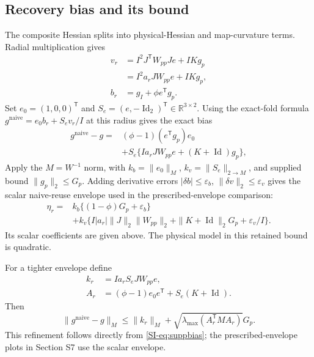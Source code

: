\subsection{Recovery bias and its bound}
The composite Hessian splits into physical-Hessian and map-curvature terms. Radial multiplication gives
\begin{equation}
 \begin{aligned}
 v_r&=I^2J^{\mathsf T}W_{pp}Je+IKg_p\\
    &=I^2a_rJW_{pp}e+IKg_p,\\
 b_r&=g_I+\phi e^{\mathsf T}g_p.
 \end{aligned}
 \label{SI-eq:suppnearhvp}
\end{equation}
Set $e_0=(1,0,0)^{\mathsf T}$ and $S_e=(e,-\operatorname{Id}_2)^{\mathsf T}\in\mathbb R^{3\times2}$. Using the exact-fold formula $g^{\mathrm{naive}}=e_0b_r+S_ev_r/I$ at this radius gives the exact bias
\begin{equation}
 \begin{aligned}
 g^{\mathrm{naive}}-g={}&(\phi-1)(e^{\mathsf T}g_p)e_0\\
 &+S_e\{Ia_rJW_{pp}e+(K+\operatorname{Id})g_p\},
 \end{aligned}
 \label{SI-eq:suppbias}
\end{equation}
Apply the $M=W^{-1}$ norm, with $k_b=\|e_0\|_M$, $k_v=\|S_e\|_{2\to M}$, and supplied bound $\|g_p\|_2\leq G_p$. Adding derivative errors $|\delta b|\leq\varepsilon_b$, $\|\delta v\|_2\leq\varepsilon_v$ gives the scalar naive-reuse envelope used in the prescribed-envelope comparison:
\begin{equation}
 \begin{aligned}
 \eta_r={}&k_b\{(1-\phi)G_p+\varepsilon_b\}\\
 &+k_v\{I|a_r|\|J\|_2\|W_{pp}\|_2
       +\|K+\operatorname{Id}\|_2G_p+\varepsilon_v/I\}.
 \end{aligned}
 \label{SI-eq:nearenvelope}
\end{equation}
Its scalar coefficients are given above. The physical model in this retained bound is quadratic.

For a tighter envelope define
\begin{equation}
 \begin{aligned}
 k_r&=Ia_rS_eJW_{pp}e,\\
 A_r&=(\phi-1)e_0e^{\mathsf T}+S_e(K+\operatorname{Id}).
 \end{aligned}
 \label{SI-eq:suppoperator}
\end{equation}
Then
\begin{equation}
 \|g^{\mathrm{naive}}-g\|_M\leq
 \|k_r\|_M+\sqrt{\lambda_{\max}(A_r^{\mathsf T}MA_r)}G_p.
 \label{SI-eq:supptightenvelope}
\end{equation}
This refinement follows directly from \eqref{SI-eq:suppbias}; the prescribed-envelope plots in Section S7 use the scalar envelope.

